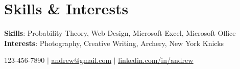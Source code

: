 \documentclass[letterpaper,11pt]{article}
\begin{document}
\section{Skills \& Interests}
 \begin{itemize}[leftmargin=0.15in, label={}]
    \small{\item{
    \vspace{1mm}
     \textbf{Skills}{: Probability Theory, Web Design, Microsoft Excel, Microsoft Office} \\
     \vspace{1mm}
     \textbf{Interests}{: Photography, Creative Writing, Archery, New York Knicks} \\
     \vspace{1mm}

    }}
 \end{itemize}
 \begin{center}
    
\small 123-456-7890 $|$
\href{mailto:ADD EMAIL HERE@x.com}{\underline{andrew@gmail.com}} $|$
\href{ADD LINKEDIN PAGE HERE}{\underline{linkedin.com/in/andrew}} 
\end{center}
\end{document}
